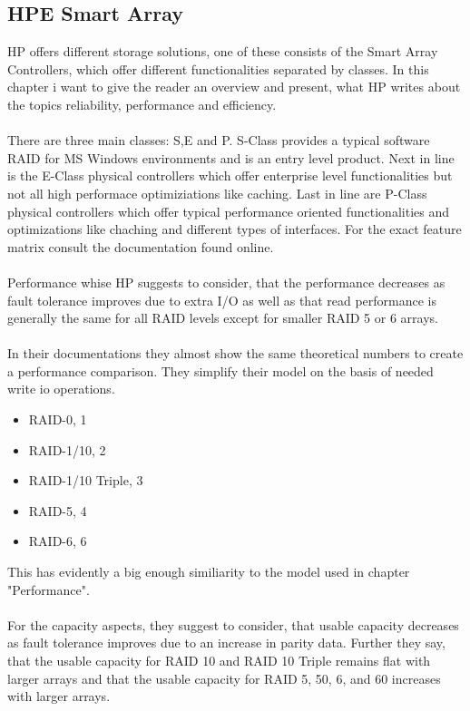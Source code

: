 \documentclass{article}
\begin{document}
\subsection{HPE Smart Array}
HP offers different storage solutions, one of
these consists of the Smart Array Controllers,
which offer different functionalities separated by classes.
In this chapter i want to give the reader an overview and present,
what HP writes about the topics reliability, performance and efficiency.
\\ \\
There are three main classes: S,E and P.
S-Class provides a typical software RAID for MS Windows
environments and is an entry level product.
Next in line is the E-Class physical controllers
which offer enterprise level functionalities but
not all high performace optimiziations like caching.
Last in line are P-Class physical controllers
which offer typical performance oriented functionalities and optimizations
like chaching and different types of interfaces.
For the exact feature matrix consult the documentation found online. \cite{hpe:sa-userguide}
\\ \\
Performance whise HP suggests to consider, 
that the performance decreases as fault tolerance improves due to extra I/O as well as that
read performance is generally the same for all RAID levels except for smaller RAID 5 or 6 arrays. \cite{hpe:sa-userguide}
\\ \\
In their documentations they almost show the same
theoretical numbers to create a performance comparison.
They simplify their model on the basis of needed write io operations.
\begin{itemize}
    \item RAID-0, 1
    \item RAID-1/10, 2
    \item RAID-1/10 Triple, 3
    \item RAID-5, 4
    \item RAID-6, 6
\end{itemize}
This has evidently a big enough similiarity to the model used in chapter "Performance".
\\ \\
For the capacity aspects, they suggest to consider, that usable capacity decreases as 
fault tolerance improves due to an increase in parity data.
Further they say, that the usable capacity for RAID 10 and RAID 10 Triple remains flat with larger arrays and
that the usable capacity for RAID 5, 50, 6, and 60 increases with larger arrays. \cite{hpe:sa-userguide}
\end{document}

